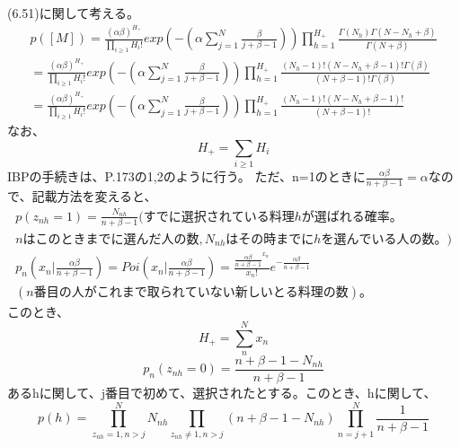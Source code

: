 ﻿\documentclass{jsarticle}
\begin{document}
(6.51)に関して考える。
\begin{equation}
\begin{split}
p([M]) = \frac{(\alpha\beta)^{H_+}}{\prod_{i \geq 1}H_i!} exp(-(\alpha \sum_{j = 1}^{N}\frac{\beta}{j + \beta - 1}))　\prod_{h=1}^{H_+}  \frac{\Gamma(N_h)\Gamma(N - N_h + \beta)}{\Gamma(N + \beta) }\\
= \frac{(\alpha\beta)^{H_+}}{\prod_{i \geq 1}H_i!} exp(-(\alpha \sum_{j = 1}^{N}\frac{\beta}{j + \beta - 1}))　\prod_{h=1}^{H_+}  \frac{(N_h - 1)! (N - N_h + \beta - 1)! \Gamma(\beta)}{(N + \beta - 1)!\Gamma(\beta) }\\
= \frac{(\alpha\beta)^{H_+}}{\prod_{i \geq 1}H_i!} exp(-(\alpha \sum_{j = 1}^{N}\frac{\beta}{j + \beta - 1}))　\prod_{h=1}^{H_+}  \frac{(N_h - 1)! (N - N_h + \beta - 1)!}{(N + \beta - 1)! }
\end{split}
\end{equation}
なお、
\begin{equation}
H_{+} = \sum_{i \geq 1} H_i
\end{equation}
IBPの手続きは、P.173の1,2のように行う。
ただ、n=1のときに$\frac{\alpha\beta}{n+\beta-1}=\alpha$なので、記載方法を変えると、
\begin{equation}
\begin{split}
p(z_{nh}=1) = \frac{N_{nh}}{n + \beta - 1}(すでに選択されている料理hが選ばれる確率。\\
nはこのときまでに選んだ人の数,N_{nh}はその時までにhを選んでいる人の数。)\\
p_n(x_n | \frac{\alpha\beta}{n + \beta -1}) = Poi(x_n | \frac{\alpha\beta}{n + \beta -1}) = \frac{{\frac{\alpha\beta}{n + \beta -1}}^{x_n}}{x_n !}e^{-\frac{\alpha\beta}{n + \beta -1}}\\
(n番目の人がこれまで取られていない新しいとる料理の数)。
\end{split}
\end{equation}
このとき、
\begin{equation}
H_{+} = \sum_n^N x_n
\end{equation}
\begin{equation}
p_n(z_{nh}=0) = \frac{n + \beta - 1 - N_{nh}}{n + \beta - 1}
\end{equation}
あるhに関して、j番目で初めて、選択されたとする。このとき、hに関して、
\begin{equation}
p(h) = \prod_{z_{nh} = 1,n>j}^{N} N_{nh} \prod_{z_{nh} \neq 1, n>j}(n + \beta - 1 - N_{nh})\prod_{n = j+1}^{N} \frac{1}{n + \beta - 1}
\end{equation}
\end{document}
